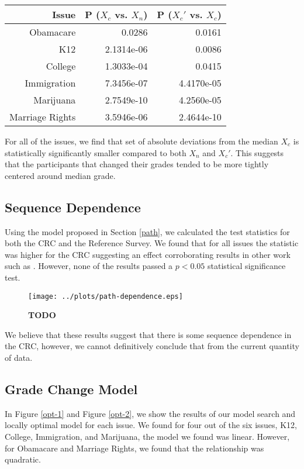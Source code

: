 \begin{tabular}[!ht] { r | r | r }
\label{dev-2}
  Issue & P ($X_c$ vs. $X_n$) & P ($X_c'$ vs. $X_c$)\\
  \hline
  \hline
  Obamacare &  0.0286 & 0.0161 \\
  \hline
  K12 & 2.1314e-06 &  0.0086 \\
  \hline
  College & 1.3033e-04 & 0.0415 \\
  \hline
  Immigration & 7.3456e-07 &4.4170e-05\\
  \hline
  Marijuana & 2.7549e-10 & 4.2560e-05\\
  \hline
  Marriage Rights & 3.5946e-06 & 2.4644e-10 \\
\end{tabular}

For all of the issues, we find that set of absolute deviations from the median $X_c$ is statistically significantly smaller compared to both $X_n$ and $X_c'$.
This suggests that the participants that changed their grades tended to be more tightly centered around median grade.

\subsection{Sequence Dependence}
Using the model proposed in Section \ref{path}, we calculated the test statistics for both the CRC and the Reference Survey.
We found that for all issues the statistic was higher for the CRC suggesting an effect corroborating results in other work such as \cite{???}.
However, none of the results passed a $p < 0.05$ statistical significance test.
\begin{figure}[h!]
  \centering
    \texttt{[image: ../plots/path-dependence.eps]}
      \caption{\textbf{TODO}}
      \label{path-1}
\end{figure}
We believe that these results suggest that there is some sequence dependence in the CRC, however, we cannot definitively conclude that from the current quantity of data.

\subsection{Grade Change Model}
In Figure \ref{opt-1} and Figure \ref{opt-2}, we show the results of our model search and locally optimal model for each issue.
We found for four out of the six issues, K12, College, Immigration, and Marijuana, the model we found was linear.
However, for Obamacare and Marriage Rights, we found that the relationship was quadratic.

